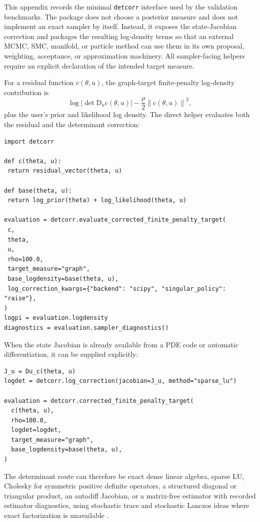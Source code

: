 \documentclass[11pt]{article}
\newcommand{\D}{\mathrm{D}}
\newcommand{\abs}[1]{\left\lvert #1\right\rvert}
\newcommand{\norm}[1]{\left\lVert #1\right\rVert}
\newcommand{\detcorr}{\texttt{detcorr}}
\begin{document}
This appendix records the minimal \detcorr{} interface used by the validation benchmarks. The package does not choose a posterior measure and does not implement an exact sampler by itself. Instead, it exposes the state-Jacobian correction and packages the resulting log-density terms so that an external MCMC, SMC, manifold, or particle method can use them in its own proposal, weighting, acceptance, or approximation machinery. All sampler-facing helpers require an explicit declaration of the intended target measure.

For a residual function \(c(\theta,u)\), the graph-target finite-penalty log-density contribution is
\begin{equation}
 \log\abs{\det \D_u c(\theta,u)}
 -\frac{\rho}{2}\norm{c(\theta,u)}^2,
 \label{eq:app_unweighted_target_helper}
\end{equation}
plus the user's prior and likelihood log density. The direct helper evaluates both the residual and the determinant correction:
\begin{verbatim}
import detcorr

def c(theta, u):
 return residual_vector(theta, u)

def base(theta, u):
 return log_prior(theta) + log_likelihood(theta, u)

evaluation = detcorr.evaluate_corrected_finite_penalty_target(
 c,
 theta,
 u,
 rho=100.0,
 target_measure="graph",
 base_logdensity=base(theta, u),
 log_correction_kwargs={"backend": "scipy", "singular_policy": "raise"},
)
logpi = evaluation.logdensity
diagnostics = evaluation.sampler_diagnostics()
\end{verbatim}
When the state Jacobian is already available from a PDE code or automatic differentiation, it can be supplied explicitly:
\begin{verbatim}
J_u = Du_c(theta, u)
logdet = detcorr.log_correction(jacobian=J_u, method="sparse_lu")

evaluation = detcorr.corrected_finite_penalty_target(
  c(theta, u),
  rho=100.0,
  logdet=logdet,
  target_measure="graph",
  base_logdensity=base(theta, u),
)
\end{verbatim}
The determinant route can therefore be exact dense linear algebra, sparse LU, Cholesky for symmetric positive definite operators, a structured diagonal or triangular product, an autodiff Jacobian, or a matrix-free estimator with recorded estimator diagnostics, using stochastic trace and stochastic Lanczos ideas where exact factorization is unavailable \cite{Hutchinson1989,UbaruChenSaad2017,MeyerMuscoMuscoWoodruff2021}.
\end{document}
